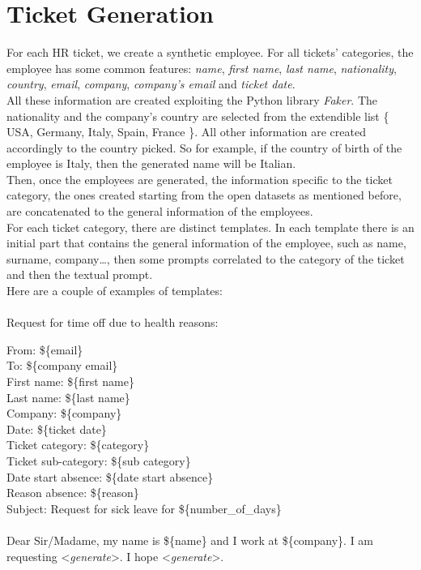 \section{Ticket Generation}
For each HR ticket, we create a synthetic employee. For all tickets' categories, the employee has some common features: \textit{name}, \textit{first name}, \textit{last name}, \textit{nationality}, \textit{country}, \textit{email}, \textit{company}, \textit{company's email} and \textit{ticket date}.\\
All these information are created exploiting the Python library \textit{Faker}. The nationality and the company's country are selected from the extendible list \{ USA, Germany, Italy, Spain, France \}. All other information are created accordingly to the country picked. So for example, if the country of birth of the employee is Italy, then the generated name will be Italian. \\
Then, once the employees are generated, the information specific to the ticket category, the ones created starting from the open datasets as mentioned before, are concatenated to the general information of the employees. \\
For each ticket category, there are distinct templates. In each template there is an initial part that contains the general information of the employee, such as name, surname, company\dots, then some prompts correlated to the category of the ticket and then the textual prompt. \\
Here are a couple of examples of templates:\\ \\
Request for time off due to health reasons:
\begin{adjustwidth}{1cm}{}
From: \$\{email\} \\
To: \$\{company email\} \\
First name: \$\{first name\}\\
Last name: \$\{last name\}\\
Company: \$\{company\}\\
Date: \$\{ticket date\}\\
Ticket category: \$\{category\}\\
Ticket sub-category: \$\{sub category\} \\
Date start absence: \$\{date start absence\} \\
Reason absence: \$\{reason\} \\ 
Subject: Request for sick leave for \$\{number\_of\_days\} \\ 
\\
Dear Sir/Madame, my name is \$\{name\} and I work at \$\{company\}. I am requesting \textless \textit{generate}\textgreater. I hope \textless \textit{generate}\textgreater. \\ \\

\end{adjustwidth}
